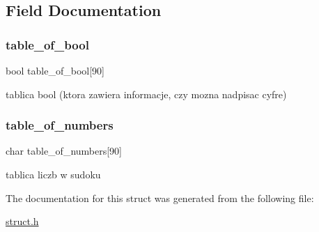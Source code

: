 \subsection{Field Documentation}
\mbox{\label{structsudoku__table_a6130b17f77753d54f4a0acdc07fb1e0a}} 
\subsubsection{\texorpdfstring{table\_of\_bool}{table\_of\_bool}}
{\footnotesize\ttfamily bool table\+\_\+of\+\_\+bool\mbox{[}90\mbox{]}}



tablica bool (ktora zawiera informacje, czy mozna nadpisac cyfre) 

\mbox{\label{structsudoku__table_a661729e27124049e643cbcb860278e5e}} 
\subsubsection{\texorpdfstring{table\_of\_numbers}{table\_of\_numbers}}
{\footnotesize\ttfamily char table\+\_\+of\+\_\+numbers\mbox{[}90\mbox{]}}



tablica liczb w sudoku 



The documentation for this struct was generated from the following file\+:\begin{DoxyCompactItemize}
\item 
\mbox{\hyperlink{struct_8h}{struct.\+h}}\end{DoxyCompactItemize}
